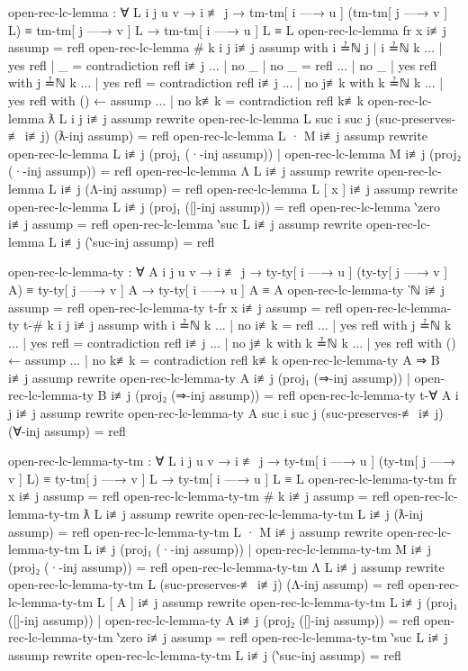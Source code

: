 \documentclass[logo,bsc,singlespacing,parskip,online]{infthesis}
\renewenvironment{code}{\mintedcopy[breaklines,breaksymbolleft=\;]{agda}}{\endmintedcopy}
\begin{document}
\begin{code}
  open-rec-lc-lemma : ∀ {L i j u v}
    → i ≢ j
    → tm-tm[ i —→ u ] (tm-tm[ j —→ v ] L) ≡ tm-tm[ j —→ v ] L
    → tm-tm[ i —→ u ] L ≡ L
  open-rec-lc-lemma {fr x} i≢j assump = refl
  open-rec-lc-lemma {# k} {i} {j} i≢j assump
    with i ≟ℕ j | i ≟ℕ k
  ... | yes refl | _ = contradiction refl i≢j
  ... | no _     | no _ = refl
  ... | no _     | yes refl with j ≟ℕ k
  ...   | yes refl = contradiction refl i≢j
  ...   | no j≢k with k ≟ℕ k
  ...     | yes refl with () ← assump
  ...     | no  k≢k  = contradiction refl k≢k
  open-rec-lc-lemma {ƛ L} {i} {j} i≢j assump
    rewrite open-rec-lc-lemma {L} {suc i} {suc j}
      (suc-preserves-≢ i≢j)
      (ƛ-inj assump)
    = refl
  open-rec-lc-lemma {L · M} i≢j assump rewrite
      open-rec-lc-lemma {L} i≢j (proj₁ (·-inj assump))
    | open-rec-lc-lemma {M} i≢j (proj₂ (·-inj assump))
    = refl
  open-rec-lc-lemma {Λ L} i≢j assump
    rewrite open-rec-lc-lemma {L} i≢j (Λ-inj assump) = refl
  open-rec-lc-lemma {L [ x ]} i≢j assump
    rewrite open-rec-lc-lemma {L} i≢j (proj₁ ([]-inj assump)) = refl
  open-rec-lc-lemma {‵zero} i≢j assump = refl
  open-rec-lc-lemma {‵suc L} i≢j assump
    rewrite open-rec-lc-lemma {L} i≢j (‵suc-inj assump) = refl


  open-rec-lc-lemma-ty : ∀ {A i j u v}
    → i ≢ j
    → ty-ty[ i —→ u ] (ty-ty[ j —→ v ] A) ≡ ty-ty[ j —→ v ] A
    → ty-ty[ i —→ u ] A ≡ A
  open-rec-lc-lemma-ty {‵ℕ} i≢j assump = refl
  open-rec-lc-lemma-ty {t-fr x} i≢j assump = refl
  open-rec-lc-lemma-ty {t-# k} {i} {j} i≢j assump with i ≟ℕ k
  ... | no  i≢k  = refl
  ... | yes refl with j ≟ℕ k
  ...   | yes refl = contradiction refl i≢j
  ...   | no  j≢k with k ≟ℕ k
  ...     | yes refl with () ← assump
  ...     | no  k≢k = contradiction refl k≢k
  open-rec-lc-lemma-ty {A ⇒ B} i≢j assump rewrite
      open-rec-lc-lemma-ty {A} i≢j (proj₁ (⇒-inj assump))
    | open-rec-lc-lemma-ty {B} i≢j (proj₂ (⇒-inj assump))
    = refl
  open-rec-lc-lemma-ty {t-∀ A} {i} {j} i≢j assump
    rewrite open-rec-lc-lemma-ty {A} {suc i} {suc j}
      (suc-preserves-≢ i≢j)
      (∀-inj assump)
        = refl

  open-rec-lc-lemma-ty-tm : ∀ {L i j u v}
    → i ≢ j
    → ty-tm[ i —→ u ] (ty-tm[ j —→ v ] L) ≡ ty-tm[ j —→ v ] L
    → ty-tm[ i —→ u ] L ≡ L
  open-rec-lc-lemma-ty-tm {fr x} i≢j assump = refl
  open-rec-lc-lemma-ty-tm {# k} i≢j assump = refl
  open-rec-lc-lemma-ty-tm {ƛ L} i≢j assump rewrite
    open-rec-lc-lemma-ty-tm {L} i≢j (ƛ-inj assump) = refl
  open-rec-lc-lemma-ty-tm {L · M} i≢j assump rewrite
      open-rec-lc-lemma-ty-tm {L} i≢j (proj₁ (·-inj assump))
    | open-rec-lc-lemma-ty-tm {M} i≢j (proj₂ (·-inj assump)) = refl
  open-rec-lc-lemma-ty-tm {Λ L} i≢j assump rewrite
    open-rec-lc-lemma-ty-tm {L} (suc-preserves-≢ i≢j) (Λ-inj assump) = refl
  open-rec-lc-lemma-ty-tm {L [ A ]} i≢j assump rewrite
      open-rec-lc-lemma-ty-tm {L} i≢j (proj₁ ([]-inj assump))
    | open-rec-lc-lemma-ty {A} i≢j (proj₂ ([]-inj assump)) = refl
  open-rec-lc-lemma-ty-tm {‵zero} i≢j assump = refl
  open-rec-lc-lemma-ty-tm {‵suc L} i≢j assump rewrite
    open-rec-lc-lemma-ty-tm {L} i≢j (‵suc-inj assump) = refl


\end{code}
\end{document}
